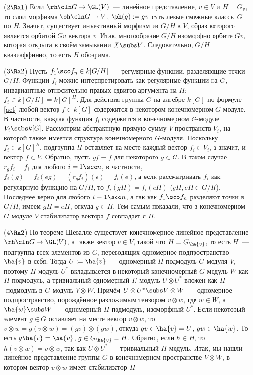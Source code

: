 \documentclass{article}
\begin{document}
($2\Ra1$) Если $\rh\cln G\to\GL(V)$~--- линейное представление, $v\in V$ и $H=G_v$, то слои морфизма $\ph\cln G\to
V$, $\ph(g):=gv$ суть левые смежные классы $G$ по $H$. Значит, существует инъективный морфизм из $G/H$ в $V$,
образ которого является орбитой $Gv$ вектора $v$. Итак, многообразие $G/H$ изоморфно орбите $Gv$, которая открыта
в своём замыкании $X\subs V$. Следовательно, $G/H$ квазиаффинно, то есть $H$ обозрима.

($3\Ra2$) Пусть $f_1\sco f_n\in k[G/H]$~--- регулярные функции, разделяющие точки $G/H$. Функции $f_i$ можно
интерпретировать как регулярные функции на $G$, инвариантные относительно правых сдвигов аргумента на $H$: $f_i\in
k[G/H]=k[G]^H$. Для действия группы $G$ на алгебре $k[G]$ по формуле \eqref{act} любой вектор $f\in k[G]$
содержится в некотором конечномерном $G$-модуле. В частности, каждая функция $f_i$ содержится в конечномерном
$G$-модуле $V_i\subs k[G]$. Рассмотрим абстрактную прямую сумму $V$ пространств $V_i$, на которой также имеется
структура конечномерного $G$-модуля. Поскольку $f_i\in k[G]^H$, подгруппа $H$ оставляет на месте каждый вектор
$f_i\in V_i$, а значит, и вектор $f\in V$. Обратно, пусть $gf=f$ для некоторого $g\in G$. В таком случае
$r_gf_i=f_i$ для любого $i=1\sco n$, в частности, $f_i(g)=f_i(eg)=(r_gf_i)(e)=f_i(e)$, а если рассматривать $f_i$
как регулярную функцию на $G/H$, то $f_i(gH)=f_i(eH)$ ($gH,eH\in G/H$). Последнее верно для любого $i=1\sco n$, а
так как $f_1\sco f_n$ разделяют точки в $G/H$, имеем $gH=eH$, откуда $g\in H$. Тем самым показали, что в
конечномерном $G$-модуле $V$ стабилизатор вектора $f$ совпадает с $H$.

($4\Ra2$) По теореме Шевалле существует конечномерное линейное представление $\rh\cln G\to\GL(V)$, а также вектор
$v\in V$, такой что $H=G_{\ha{v}}$, то есть $H$~--- подгруппа всех элементов из $G$, переводящих одномерное
подпространство $\ha{v}$ в себя. Тогда $U:=\ha{v}$~--- одномерный $H$-подмодуль $G$-модуля $V$, поэтому $H$-модуль
$U^*$ вкладывается в некоторый конечномерный $G$-модуль $W$ как $H$-подмодуль, а тривиальный одномерный $H$-модуль
$U\otimes U^*$ вложен как $H$-подмодуль в $G$-модуль $V\otimes W$. Причём $U\otimes U^*\subs V\otimes W$~---
одномерное подпространство, порождённое разложимым тензором $v\otimes w$, где $w\in W$, а $\ha{w}\subs W$~---
одномерный $H$-подмодуль, изоморфный $U^*$. Если некоторый элемент $g\in G$ оставляет на месте вектор $v\otimes
w$, то $v\otimes w=g(v\otimes w)=(gv)\otimes(gw)$, откуда $gv\in\ha{v}=U$, $gw\in\ha{w}$. То есть
$g\ha{v}=\ha{v}$, $g\in G_{\ha{v}}=H$. Обратно, если $h\in H$, то $h(v\otimes w)=v\otimes w$, так как $U\otimes
U^*$~--- тривиальный $H$-модуль. Итак, мы нашли линейное представление группы $G$ в конечномерном пространстве
$V\otimes W$, в котором вектор $v\otimes w$ имеет стабилизатор $H$.
\end{document}
